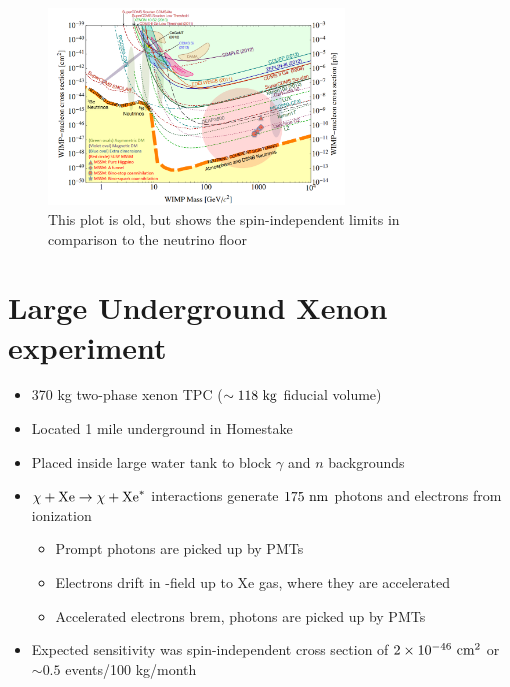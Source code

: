 \begin{figure}[H]
\begin{center}
  \includegraphics[width=0.7\textwidth]{figs/ddlimits.png}\\
  This plot is old, but shows the spin-independent limits in comparison to the neutrino floor
\end{center}
\end{figure}

\section{Large Underground Xenon experiment}
\begin{itemize}
  \item 370 kg two-phase xenon TPC ($\sim118~\text{kg}$ fiducial volume)
  \item Located 1 mile underground in Homestake
  \item Placed inside large water tank to block $\gamma$ and $n$ backgrounds
  \item $\chi +\text{Xe} \rightarrow \chi+\text{Xe}^*$ interactions generate $175~\text{nm}$ photons and electrons from ionization
  \begin{itemize}
    \item Prompt photons are picked up by PMTs
    \item Electrons drift in \E-field up to Xe gas, where they are accelerated
    \item Accelerated electrons brem, photons are picked up by PMTs
  \end{itemize}
  \item Expected sensitivity was spin-independent cross section of $2\times10^{-46}~\text{cm}^2$ or $\sim 0.5$ events/100 kg/month
\end{itemize}


